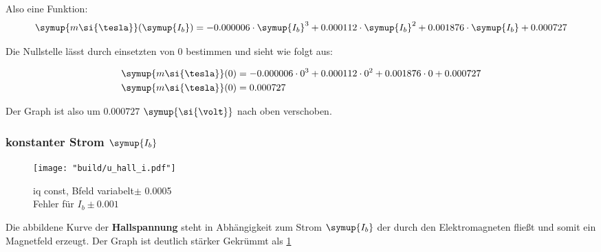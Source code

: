 Also eine Funktion:
\begin{equation}
   \symup{m\si{\tesla}}(\symup{I_b})=-0.000006 \cdot \symup{I_b}^3 + 0.000112\cdot\symup{I_b}^2 + 0.001876 \cdot\symup{I_b} + 0.000727 
\end{equation}

Die Nullstelle lässt durch einsetzten von $0$ bestimmen und sieht wie folgt aus:

\begin{align}
   \symup{m\si{\tesla}}(0)&=-0.000006 \cdot 0^3 + 0.000112 \cdot 0^2 + 0.001876 \cdot 0 + 0.000727 \\
   \symup{m\si{\tesla}}(0)&=0.000727
\end{align}

Der Graph ist also um $0.000727$ $\symup{\si{\volt}}$ nach oben verschoben.


\subsubsection{konstanter Strom $\symup{I_b}$}
\label{sec:Auswertung_iconst}

\begin{figure}
   \centering
    \texttt{[image: "build/u\_hall\_i.pdf"]}
    \caption{iq const, Bfeld variabelt$\pm$ 0.0005\\Fehler für $I_b \pm 0.001$}
    \label{fig:Uhall}
 \end{figure}


Die abbildene Kurve der \textbf{Hallspannung} steht in Abhängigkeit zum Strom $\symup{I_b}$ der durch den Elektromagneten fließt und somit ein Magnetfeld erzeugt.
Der Graph ist deutlich stärker Gekrümmt als \ref{fig:Uhall} 
